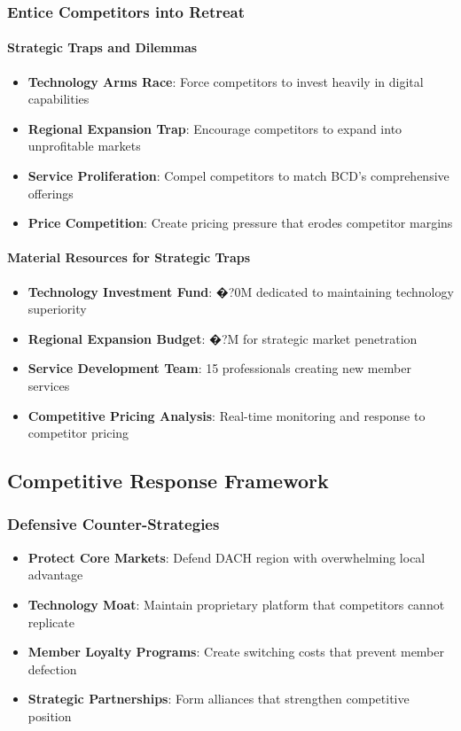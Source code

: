 \subsubsection{Entice Competitors into Retreat}

\paragraph{Strategic Traps and Dilemmas}
\begin{itemize}
    \item \textbf{Technology Arms Race}: Force competitors to invest heavily in digital capabilities
    \item \textbf{Regional Expansion Trap}: Encourage competitors to expand into unprofitable markets
    \item \textbf{Service Proliferation}: Compel competitors to match BCD's comprehensive offerings
    \item \textbf{Price Competition}: Create pricing pressure that erodes competitor margins
\end{itemize}

\paragraph{Material Resources for Strategic Traps}
\begin{itemize}
    \item \textbf{Technology Investment Fund}: �?0M dedicated to maintaining technology superiority
    \item \textbf{Regional Expansion Budget}: �?M for strategic market penetration
    \item \textbf{Service Development Team}: 15 professionals creating new member services
    \item \textbf{Competitive Pricing Analysis}: Real-time monitoring and response to competitor pricing
\end{itemize}

\subsection{Competitive Response Framework}

\subsubsection{Defensive Counter-Strategies}
\begin{itemize}
    \item \textbf{Protect Core Markets}: Defend DACH region with overwhelming local advantage
    \item \textbf{Technology Moat}: Maintain proprietary platform that competitors cannot replicate
    \item \textbf{Member Loyalty Programs}: Create switching costs that prevent member defection
    \item \textbf{Strategic Partnerships}: Form alliances that strengthen competitive position
\end{itemize}

